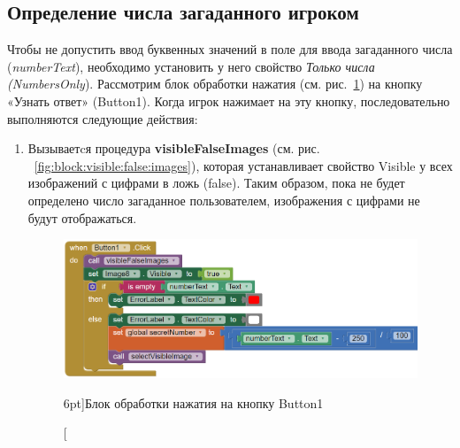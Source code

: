 \subsection{Определение числа загаданного игроком}
Чтобы не допустить ввод буквенных значений в поле для ввода загаданного числа (\textit{numberText}), необходимо установить у него свойство \textit{Только числа} \textit{(NumbersOnly}). Рассмотрим блок обработки нажатия (см. рис.~\ref{fig:block:button:click}) на кнопку «Узнать ответ» (Button1).
Когда игрок нажимает на эту кнопку, последовательно выполняются следующие действия:
\begin{enumerate}
  \item Вызываетcя процедура \textbf{visibleFalseImages} (см. рис. ~\ref{fig:block:visible:false:images}), которая устанавливает свойство Visible у всех изображений с цифрами в ложь (false). Таким образом, пока не будет определено число загаданное пользователем, изображения с цифрами не будут отображаться.
  \begin{figure}
    \includegraphics{./graphics/programs/guess_numbers/block_Button1Click_AppInventor_2018.png}
      \caption[Блок обработки нажатия на кнопку Button1.][6pt]{Блок обработки нажатия на кнопку Button1}
    \label{fig:block:button:click}
  \end{figure}


\end{enumerate}
